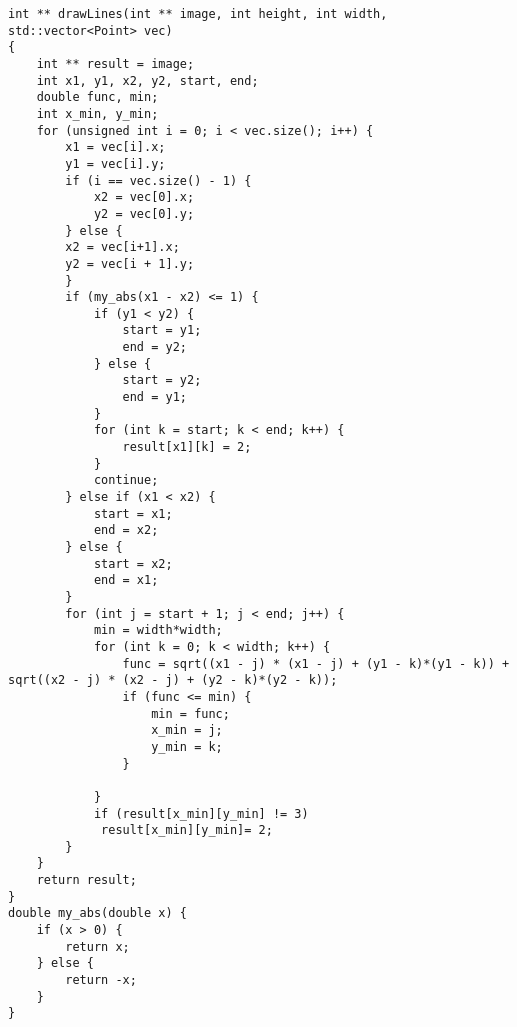 \documentclass{report}
\begin{document}
\begin{lstlisting}
int ** drawLines(int ** image, int height, int width, std::vector<Point> vec)
{
    int ** result = image;
    int x1, y1, x2, y2, start, end;
    double func, min;
    int x_min, y_min;
    for (unsigned int i = 0; i < vec.size(); i++) {
        x1 = vec[i].x;
        y1 = vec[i].y;
        if (i == vec.size() - 1) {
            x2 = vec[0].x;
            y2 = vec[0].y;
        } else {
        x2 = vec[i+1].x;
        y2 = vec[i + 1].y;
        }
        if (my_abs(x1 - x2) <= 1) {
            if (y1 < y2) {
                start = y1;
                end = y2;
            } else {
                start = y2;
                end = y1;    
            }
            for (int k = start; k < end; k++) {
                result[x1][k] = 2;
            }
            continue;            
        } else if (x1 < x2) {
            start = x1;
            end = x2;
        } else {
            start = x2;
            end = x1;
        }
        for (int j = start + 1; j < end; j++) {
            min = width*width;
            for (int k = 0; k < width; k++) {
                func = sqrt((x1 - j) * (x1 - j) + (y1 - k)*(y1 - k)) + sqrt((x2 - j) * (x2 - j) + (y2 - k)*(y2 - k));
                if (func <= min) {
                    min = func;
                    x_min = j;
                    y_min = k;
                }
                
            }
            if (result[x_min][y_min] != 3)
             result[x_min][y_min]= 2;
        }
    }
    return result;
}
double my_abs(double x) {
    if (x > 0) {
        return x;
    } else {
        return -x;
    }
}
\end{lstlisting}
    
\end{document}
